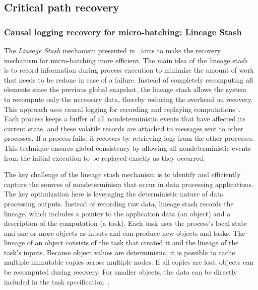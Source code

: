 \subsection{Critical path recovery}
\label{phd-related-critical-path-recovery}

\subsubsection{Causal logging recovery for micro-batching: Lineage Stash}

The {\em Lineage Stash} mechanism presented in~\cite{Wang:2019:LSF:3341301.3359653} aims to make the recovery mechanism for micro-batching more efficient. The main idea of the lineage stash is to record information during process execution to minimize the amount of work that needs to be redone in case of a failure. Instead of completely recomputing all elements since the previous global snapshot, the lineage stash allows the system to recompute only the necessary data, thereby reducing the overhead on recovery. This approach uses causal logging for recording and replaying computations~\cite{elnozahy1994manetho, alvisi1998message}. Each process keeps a buffer of all nondeterministic events that have affected its current state, and these volatile records are attached to messages sent to other processes. If a process fails, it recovers by retrieving logs from the other processes. This technique ensures global consistency by allowing all nondeterministic events from the initial execution to be replayed exactly as they occurred.

The key challenge of the lineage stash mechanism is to identify and efficiently capture the sources of nondeterminism that occur in data processing applications. The key optimization here is leveraging the deterministic nature of data processing outputs. Instead of recording raw data, lineage stash records the lineage, which includes a pointer to the application data (an object) and a description of the computation (a task). Each task uses the process's local state and one or more objects as inputs and can produce new objects and tasks. The lineage of an object consists of the task that created it and the lineage of the task's inputs. Because object values are deterministic, it is possible to cache multiple immutable copies across multiple nodes. If all copies are lost, objects can be recomputed during recovery. For smaller objects, the data can be directly included in the task specification~\cite{Wang:2019:LSF:3341301.3359653}.

